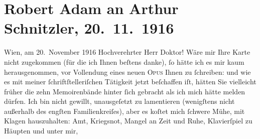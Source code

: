 

         
         \newcommand{\erwaehntePersonen}{Personen: Peter Gast, Max Kemmerich, Friedrich Nietzsche, Romain Rolland}
         \newcommand{\erwaehnteInstitutionen}{Institutionen: Nobelpreis}
         \newcommand{\erwaehnteOrte}{Orte: Frankreich, Wien, XII., Meidling}
         \newcommand{\erwaehnteWerke}{Werke: Jean Christophe, Meine Memoiren, Märchenkomödie, Prophezeiungen – Wahn oder Wirklichkeit?, Wilhelm Meister, Wundervogel}
               \section[Robert Adam an Arthur Schnitzler, 20. 11. 1916]{ Robert Adam an Arthur Schnitzler, 20. 11. 1916}\nopagebreak{}\rehead{ }\begin{ledgroupsized}[t]{13cm}\normalsize\beginnumbering \toendnotes[C]{\smallbreak\pagebreak[2]} 
\toendnotes[C]{\smallbreak}\pstart
           \raggedleft{}{\pb}Wien, am 20. November 1916\pend
           \pstart{}Hochverehrter Herr Doktor!\pend\pstart
           Wäre mir Ihre Karte nicht zugekommen (für die ich Ihnen beſtens danke), ſo hätte ich
               es mir kaum herausgenommen, vor Vollendung eines neuen \textsc{Opus}
               Ihnen zu ſchreiben: und wie es mit meiner ſchriftſtelleriſchen Tätigkeit jetzt
               beſchaffen iſt,  hätten Sie vielleicht früher die
               zehn Memoirenbände hinter ſich
               gebracht als ich mich hätte melden dürfen. Ich bin nicht gewillt, unausgeſetzt zu
               lamentieren (wenigſtens nicht außerhalb des engſten Familienkreiſes), aber es koſtet
               mich ſchwere Mühe, mit Klagen hauszuhalten: Amt, Kriegs{\pb}not, Mangel an Zeit und Ruhe, Klavierſpiel zu Häupten und unter mir,

\end{ledgroupsized}
